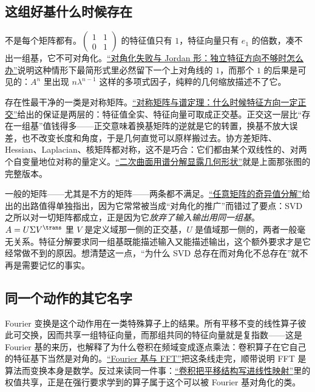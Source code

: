 \subsection{这组好基什么时候存在}

不是每个矩阵都有。\(\begin{pmatrix}1&1\\0&1\end{pmatrix}\) 的特征值只有 \(1\)，特征向量只有 \(e_1\) 的倍数，凑不出一组基，它不可对角化。\hyperref[sec:03-Linear-Algebra/05-Eigenvalues-and-Eigenvectors/03]{``对角化失败与 Jordan 形：独立特征方向不够时怎么办''}说明这种情形下最简形式里必然留下一个上对角线的 \(1\)，而那个 \(1\) 的后果是可见的：\(A^{n}\) 里出现 \(n\lambda^{n-1}\) 这样的多项式因子，纯粹的几何缩放描述不了它。

存在性最干净的一类是对称矩阵。\hyperref[sec:03-Linear-Algebra/06-Symmetric-and-Positive-Definite-Matrices/01]{``对称矩阵与谱定理：什么时候特征方向一定正交''}给出的保证是两层的：特征值全实、特征向量可取成正交基。正交这一层比``存在一组基''值钱得多——正交意味着换基矩阵的逆就是它的转置，换基不放大误差，也不改变长度和角度，于是几何直觉可以原样搬过去。协方差矩阵、Hessian、Laplacian、核矩阵都对称，这不是巧合：它们都由某个双线性的、对两个自变量地位对称的量定义。\hyperref[sec:03-Linear-Algebra/06-Symmetric-and-Positive-Definite-Matrices/04]{``二次曲面用谱分解显露几何形状''}就是上面那张图的完整版本。

一般的矩阵——尤其是不方的矩阵——两条都不满足。\hyperref[sec:03-Linear-Algebra/07-SVD-and-Data-Applications/01]{``任意矩阵的奇异值分解''}给出的出路值得单独指出，因为它常常被当成``对角化的推广''而错过了要点：SVD 之所以对一切矩阵都成立，正是因为它\emph{放弃了输入输出用同一组基}。\(A = U\Sigma V^{\trans}\) 里 \(V\) 是定义域那一侧的正交基，\(U\) 是值域那一侧的，两者一般毫无关系。特征分解要求同一组基既能描述输入又能描述输出，这个额外要求才是它经常做不到的原因。想清楚这一点，``为什么 SVD 总存在而对角化不总存在''就不再是需要记忆的事实。

\subsection{同一个动作的其它名字}

Fourier 变换是这个动作用在一类特殊算子上的结果。所有平移不变的线性算子彼此可交换，因而共享一组特征向量，而那组共同的特征向量就是复指数——这是 Fourier 基的来历，也解释了为什么卷积在频域变成逐点乘法：卷积算子在它自己的特征基下当然是对角的。\hyperref[sec:03-Linear-Algebra/08-Complex-Matrices-and-Fourier-Structure/03]{``Fourier 基与 FFT''}把这条线走完，顺带说明 FFT 是算法而变换本身是数学。反过来读同一件事：\hyperref[sec:14-Deep-Learning/04-Convolutional-Networks/01]{``卷积把平移结构写进线性映射''}里的权值共享，正是在强行要求学到的算子属于这个可以被 Fourier 基对角化的类。

